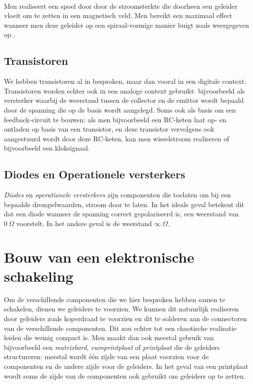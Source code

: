\paragraph{}
Men realiseert een spoel door door de stroomsterkte die doorheen een geleider vloeit om te zetten in een magnetisch veld. Men bereikt een maximaal effect wanneer men deze geleider op een spiraal-vormige manier buigt zoals weergegeven op .


\subsection{Transistoren}
We hebben transistoren al in \chpref{} besproken, maar dan vooral in een digitale context. Transistoren worden echter ook in een analoge context gebruikt: bijvoorbeeld als versterker waarbij de weerstand tussen de collector en de emittor wordt bepaald door de spanning die op de basis wordt aangelegd. Soms ook als basis om een feedback-circuit te bouwen: als men bijvoorbeeld een RC-keten laat op- en ontladen op basis van een transistor, en deze transistor vervolgens ook aangestuurd wordt door deze RC-keten, kan men wisselstroom realiseren of bijvoorbeeld een kloksignaal.
\subsection{Diodes en Operationele versterkers}
\emph{Diodes} en \emph{operationele versterkers} zijn componenten die toelaten om bij een bepaalde drempelwaarden, stroom door te laten. In het ideale geval betekent dit dat een diode wanneer de spanning correct gepolariseerd is, een weerstand van $0~\Omega$ voorstelt. In het andere geval is de weerstand $\infty~\Omega$.
\paragraph{}
\section{Bouw van een elektronische schakeling}
Om de verschillende componenten die we hier besproken hebben samen te schakelen, dienen we geleiders te voorzien. We kunnen dit natuurlijk realiseren door geleiders zoals koperdraad te voorzien en dit te solderen aan de connectoren van de verschillende componenten. Dit zou echter tot een chaotische realisatie leiden die weinig compact is. Men maakt dan ook meestal gebruik van bijvoorbeeld een \emph{matrixbord}, \emph{europrintplaat} of \emph{printplaat} die de geleiders structureren: meestal wordt \'e\'en zijde van een plaat voorzien voor de componenten en de andere zijde voor de geleiders. In het geval van een printplaat wordt soms de zijde van de componenten ook gebruikt om geleiders op te zetten.
